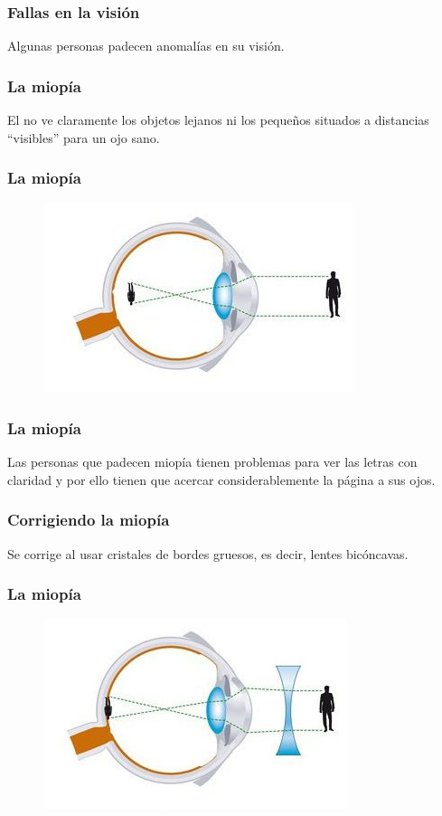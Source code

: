 \documentclass[14pt]{beamer}
\begin{document}
\begin{frame}
\frametitle{Fallas en la visión}
Algunas personas padecen anomalías en su visión.
\end{frame}
\begin{frame}
\frametitle{La miopía}
El  no ve claramente los objetos lejanos ni los pequeños situados a distancias \enquote{visibles}
para un ojo sano.
\end{frame}
\begin{frame}
\frametitle{La miopía}
\begin{figure}
    \centering
    \includegraphics[scale=3.35]{Imagenes/Defectos_Vision_01_Miopia_01.jpg}
\end{figure}
\end{frame}
\begin{frame}
\frametitle{La miopía}
Las personas que padecen miopía tienen problemas para ver las letras con claridad y por ello tienen que acercar considerablemente la página a sus ojos.
\end{frame}
\begin{frame}
\frametitle{Corrigiendo la miopía}
Se corrige al usar cristales de bordes gruesos, es decir, lentes bicóncavas.
\end{frame}
\begin{frame}
\frametitle{La miopía}
\begin{figure}
    \centering
    \includegraphics[scale=3.35]{Imagenes/Defectos_Vision_01_Miopia_02.jpg}
\end{figure}
\end{frame}    
\end{document}

